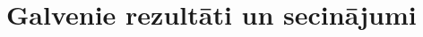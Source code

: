 \documentclass[12pt]{report}
\begin{document}
%
%
%
%
%
%
%
%
\setcounter{secnumdepth}{-1}
\chapter{Galvenie rezultāti un secinājumi} \label{chap:Secinajumi}


\nocite{SySML}





%
%
%
%
%
\end{document}
